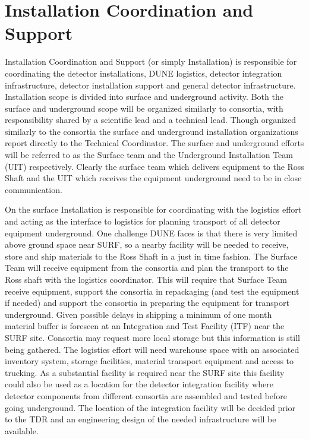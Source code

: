 \section{Installation Coordination and Support}
\label{sec:fdsp-coord-install}


Installation Coordination and Support (or simply Installation) is responsible for coordinating the detector installations, DUNE logistics, detector integration infrastructure, detector installation support and general detector infrastructure. Installation scope is divided into surface and underground
activity. Both the surface and underground scope will be organized
similarly to consortia, with responsibility shared by a scientific
lead and a technical lead. Though organized similarly to the consortia
the surface and underground installation organizations report directly
to the Technical Coordinator. The surface and underground efforts will be referred to as
the Surface team and the Underground Installation Team (UIT) respectively. Clearly
the surface team which delivers equipment to the Ross Shaft and the
UIT which receives the equipment underground need to be in close
communication. 


On the surface Installation is responsible for 
coordinating with the  logistics effort and acting as the
interface to  logistics for planning transport of all detector
equipment underground. One challenge DUNE faces is that there is very limited above ground space near SURF, so a nearby facility will be needed to receive, store and ship materials to the Ross Shaft in a just in time fashion. The Surface Team will receive equipment from the consortia
and plan the transport to the Ross shaft with the  logistics
coordinator. This will require that Surface Team receive equipment, support the
consortia in repackaging (and test the equipment if needed) and
support the consortia in preparing the equipment for transport
underground. Given possible delays in shipping a minimum of one month material
buffer is foreseen at an Integration and Test Facility (ITF) near the
SURF site. Consortia may request more local storage but this information is still being gathered. The logistics effort will need warehouse space with an associated
inventory system, storage facilities, material transport equipment and
access to trucking. As a substantial facility is required near the
SURF site this facility could also be used as a location for
the detector integration facility where detector components from
different consortia are assembled and tested before going
underground. The location of the integration facility will be decided
prior to the TDR and an engineering design of the needed
infrastructure will be available. 

